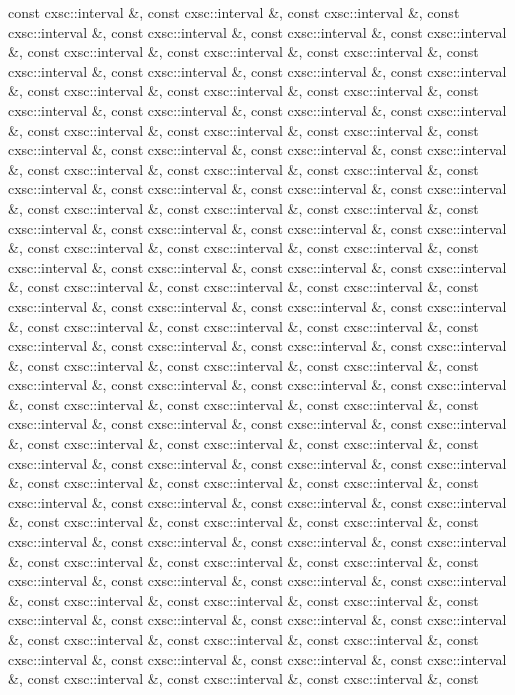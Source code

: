 \begin{DoxyCompactItemize}
const cxsc\-::interval \&, const cxsc\-::interval \&, const cxsc\-::interval \&, const cxsc\-::interval \&, const cxsc\-::interval \&, const cxsc\-::interval \&, const cxsc\-::interval \&, const cxsc\-::interval \&, const cxsc\-::interval \&, const cxsc\-::interval \&, const cxsc\-::interval \&, const cxsc\-::interval \&, const cxsc\-::interval \&, const cxsc\-::interval \&, const cxsc\-::interval \&, const cxsc\-::interval \&, const cxsc\-::interval \&, const cxsc\-::interval \&, const cxsc\-::interval \&, const cxsc\-::interval \&, const cxsc\-::interval \&, const cxsc\-::interval \&, const cxsc\-::interval \&, const cxsc\-::interval \&, const cxsc\-::interval \&, const cxsc\-::interval \&, const cxsc\-::interval \&, const cxsc\-::interval \&, const cxsc\-::interval \&, const cxsc\-::interval \&, const cxsc\-::interval \&, const cxsc\-::interval \&, const cxsc\-::interval \&, const cxsc\-::interval \&, const cxsc\-::interval \&, const cxsc\-::interval \&, const cxsc\-::interval \&, const cxsc\-::interval \&, const cxsc\-::interval \&, const cxsc\-::interval \&, const cxsc\-::interval \&, const cxsc\-::interval \&, const cxsc\-::interval \&, const cxsc\-::interval \&, const cxsc\-::interval \&, const cxsc\-::interval \&, const cxsc\-::interval \&, const cxsc\-::interval \&, const cxsc\-::interval \&, const cxsc\-::interval \&, const cxsc\-::interval \&, const cxsc\-::interval \&, const cxsc\-::interval \&, const cxsc\-::interval \&, const cxsc\-::interval \&, const cxsc\-::interval \&, const cxsc\-::interval \&, const cxsc\-::interval \&, const cxsc\-::interval \&, const cxsc\-::interval \&, const cxsc\-::interval \&, const cxsc\-::interval \&, const cxsc\-::interval \&, const cxsc\-::interval \&, const cxsc\-::interval \&, const cxsc\-::interval \&, const cxsc\-::interval \&, const cxsc\-::interval \&, const cxsc\-::interval \&, const cxsc\-::interval \&, const cxsc\-::interval \&, const cxsc\-::interval \&, const cxsc\-::interval \&, const cxsc\-::interval \&, const cxsc\-::interval \&, const cxsc\-::interval \&, const cxsc\-::interval \&, const cxsc\-::interval \&, const cxsc\-::interval \&, const cxsc\-::interval \&, const cxsc\-::interval \&, const cxsc\-::interval \&, const cxsc\-::interval \&, const cxsc\-::interval \&, const cxsc\-::interval \&, const cxsc\-::interval \&, const cxsc\-::interval \&, const cxsc\-::interval \&, const cxsc\-::interval \&, const cxsc\-::interval \&, const cxsc\-::interval \&, const cxsc\-::interval \&, const cxsc\-::interval \&, const cxsc\-::interval \&, const cxsc\-::interval \&, const cxsc\-::interval \&, const cxsc\-::interval \&, const cxsc\-::interval \&, const cxsc\-::interval \&, const cxsc\-::interval \&, const cxsc\-::interval \&, const cxsc\-::interval \&, const cxsc\-::interval \&, const cxsc\-::interval \&, const cxsc\-::interval \&, const cxsc\-::interval \&, const cxsc\-::interval \&, const cxsc\-::interval \&, const cxsc\-::interval \&, const cxsc\-::interval \&, const cxsc\-::interval \&, const cxsc\-::interval \&, const cxsc\-::interval \&, const cxsc\-::interval \&, const cxsc\-::interval \&, const cxsc\-::interval \&, const cxsc\-::interval \&, const cxsc\-::interval \&, const cxsc\-::interval \&, const cxsc\-::interval \&, const cxsc\-::interval \&, const cxsc\-::interval \&, const 
\end{DoxyCompactItemize}
